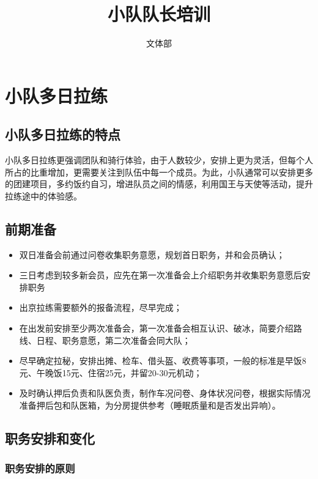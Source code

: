 \documentclass[UTF8]{ctexart}
\title{小队队长培训}
\author{文体部}
\begin{document}
\maketitle

\tableofcontents

\clearpage
\section{小队多日拉练}

\subsection{小队多日拉练的特点}

小队多日拉练更强调团队和骑行体验，由于人数较少，安排上更为灵活，但每个人所占的比重增加，更需要关注到队伍中每一个成员。为此，小队通常可以安排更多的团建项目，多约饭约自习，增进队员之间的情感，利用国王与天使等活动，提升拉练途中的体验感。

\subsection{前期准备}

\begin{itemize}[nosep,left=2em]
    \item 双日准备会前通过问卷收集职务意愿，规划首日职务，并和会员确认；
    \item 三日考虑到较多新会员，应先在第一次准备会上介绍职务并收集职务意愿后安排职务
    \item 出京拉练需要额外的报备流程，尽早完成；
    \item 在出发前安排至少两次准备会，第一次准备会相互认识、破冰，简要介绍路线、日程、职务意愿，第二次准备会同大队；
    \item 尽早确定拉秘，安排出摊、检车、借头盔、收费等事项，一般的标准是早饭8元、午晚饭15元、住宿25元，并留20-30元机动；
    \item 及时确认押后负责和队医负责，制作车况问卷、身体状况问卷，根据实际情况准备押后包和队医箱，为分房提供参考（睡眠质量和是否发出异响）。
\end{itemize}

\subsection{职务安排和变化}

\subsubsection{职务安排的原则}
\end{document}

